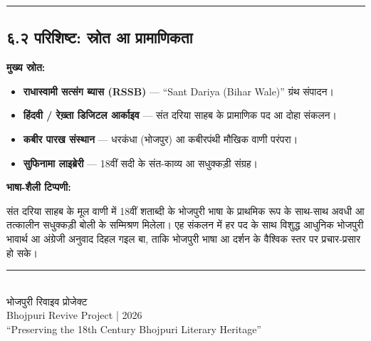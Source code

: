 \begin{center}
{\color{bordercolor}\rule{0.4\textwidth}{0.4pt}}
\end{center}

\subsection*{६.२ परिशिष्ट: स्रोत आ प्रामाणिकता}

\textbf{मुख्य स्रोत:}

\begin{itemize}
  \item \textbf{राधास्वामी सत्संग ब्यास {\engfont (RSSB)}} --- {\engfont``Sant Dariya (Bihar Wale)''} ग्रंथ संपादन।
  \item \textbf{हिंदवी / रेख़्ता डिजिटल आर्काइव} --- संत दरिया साहब के प्रामाणिक पद आ दोहा संकलन।
  \item \textbf{कबीर पारख संस्थान} --- धरकंधा (भोजपुर) आ कबीरपंथी मौखिक वाणी परंपरा।
  \item \textbf{सुफिनामा लाइब्रेरी} --- 18वीं सदी के संत-काव्य आ सधुक्कड़ी संग्रह।
\end{itemize}

\textbf{भाषा-शैली टिप्पणी:}

संत दरिया साहब के मूल वाणी में 18वीं शताब्दी के भोजपुरी भाषा के प्राथमिक रूप के साथ-साथ अवधी आ तत्कालीन सधुक्कड़ी बोली के सम्मिश्रण मिलेला। एह संकलन में हर पद के साथ विशुद्ध आधुनिक भोजपुरी भावार्थ आ अंग्रेजी अनुवाद दिहल गइल बा, ताकि भोजपुरी भाषा आ दर्शन के वैश्विक स्तर पर प्रचार-प्रसार हो सके।

\vfill

\begin{center}
{\color{bordercolor}\rule{0.4\textwidth}{0.6pt}}\\[0.6em]
{\small\color{bordercolor}
  भोजपुरी रिवाइव प्रोजेक्ट\\
  {\engfont Bhojpuri Revive Project | 2026}\\
  {\engfont ``Preserving the 18th Century Bhojpuri Literary Heritage''}
}
\end{center}
